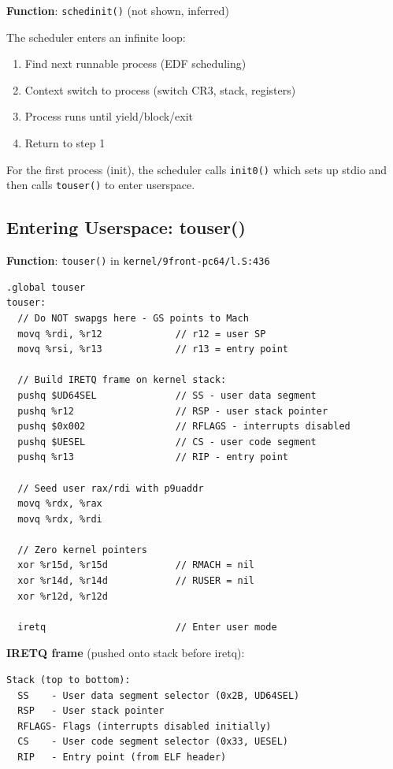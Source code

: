 \documentclass[11pt,letterpaper]{article}
\begin{document}
\textbf{Function}: \texttt{schedinit()} (not shown, inferred)

The scheduler enters an infinite loop:

\begin{enumerate}
\item Find next runnable process (EDF scheduling)
\item Context switch to process (switch CR3, stack, registers)
\item Process runs until yield/block/exit
\item Return to step 1
\end{enumerate}

For the first process (init), the scheduler calls \texttt{init0()} which sets up stdio and then calls \texttt{touser()} to enter userspace.

\subsection{Entering Userspace: touser()}

\textbf{Function}: \texttt{touser()} in \texttt{kernel/9front-pc64/l.S:436}

\begin{lstlisting}[language={[x86masm]Assembler},caption=touser() assembly]
.global touser
touser:
  // Do NOT swapgs here - GS points to Mach
  movq %rdi, %r12             // r12 = user SP
  movq %rsi, %r13             // r13 = entry point

  // Build IRETQ frame on kernel stack:
  pushq $UD64SEL              // SS - user data segment
  pushq %r12                  // RSP - user stack pointer
  pushq $0x002                // RFLAGS - interrupts disabled
  pushq $UESEL                // CS - user code segment
  pushq %r13                  // RIP - entry point

  // Seed user rax/rdi with p9uaddr
  movq %rdx, %rax
  movq %rdx, %rdi

  // Zero kernel pointers
  xor %r15d, %r15d            // RMACH = nil
  xor %r14d, %r14d            // RUSER = nil
  xor %r12d, %r12d

  iretq                       // Enter user mode
\end{lstlisting}

\textbf{IRETQ frame} (pushed onto stack before iretq):

\begin{verbatim}
Stack (top to bottom):
  SS    - User data segment selector (0x2B, UD64SEL)
  RSP   - User stack pointer
  RFLAGS- Flags (interrupts disabled initially)
  CS    - User code segment selector (0x33, UESEL)
  RIP   - Entry point (from ELF header)
\end{verbatim}
\end{document}
